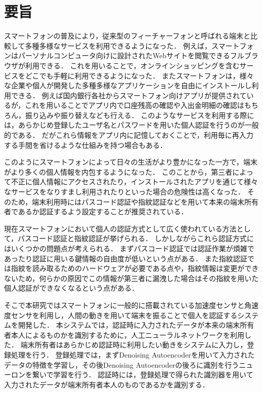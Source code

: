 \chapter*{要旨}
スマートフォンの普及により，従来型のフィーチャーフォンと呼ばれる端末と比較して多種多様なサービスを利用できるようになった．
例えば，スマートフォンはパーソナルコンピュータ向けに設計されたWebサイトを閲覧できるフルブラウザが利用できる．
これを用いることで，オンラインショッピングを含むサービスをどこでも手軽に利用できるようになった．
またスマートフォンは，様々な企業や個人が開発した多種多様なアプリケーションを自由にインストールし利用できる．
例えば国内銀行各社からスマートフォン向けアプリが提供されているが，これを用いることでアプリ内で口座残高の確認や入出金明細の確認はもちろん，振り込みや振り替えなども行える．
このようなサービスを利用する際には，あらかじめ登録したユーザ名とパスワードを用いた個人認証を行うのが一般的である．
だがこれら情報をアプリ内に記憶しておくことで，利用毎に再入力する手間を省けるような仕組みを持つ場合もある．

このようにスマートフォンによって日々の生活がより豊かになった一方で，端末がより多くの個人情報を内包するようになった．
このことから，第三者によって不正に個人情報にアクセスされたり，インストールされたアプリを通じて様々なサービスをなりすまし利用されたりといった場合の危険性は高くなった．
そのため，端末利用時にはパスコード認証や指紋認証などを用いて本来の端末所有者であるか認証するよう設定することが推奨されている．

現在スマートフォンにおいて個人の認証方式として広く使われている方法として，パスコード認証と指紋認証が挙げられる．
しかしながらこれら認証方式にはいくつかの問題点が考えられる．
まずパスコード認証では認証作業が煩雑であったり認証に用いる鍵情報の自由度が低いという点がある．
また指紋認証では指紋を読み取るためのハードウェアが必要である点や，指紋情報は変更ができないため，何らかの原因でこの情報が第三者に漏洩した場合はその指紋を用いた個人認証ができなくなるという点がある．

そこで本研究ではスマートフォンに一般的に搭載されている加速度センサと角速度センサを利用し，人間の動きを用いて端末を振ることで個人を認証するシステムを開発した．
本システムでは，認証時に入力されたデータが本来の端末所有者本人によるものかを識別するために，人工ニューラルネットワークを利用した．
端末所有者はあらかじめ認証時に利用したい動きをシステムに入力し，登録処理を行う．
登録処理では，まずDenoising Autoencoderを用いて入力されたデータの特徴を学習し，その後Denoising Autoencoderの後ろに識別を行うニューロンを繋いで学習を行う．
認証時には，登録処理で得られた識別器を用いて入力されたデータが端末所有者本人のものであるかを識別する．

